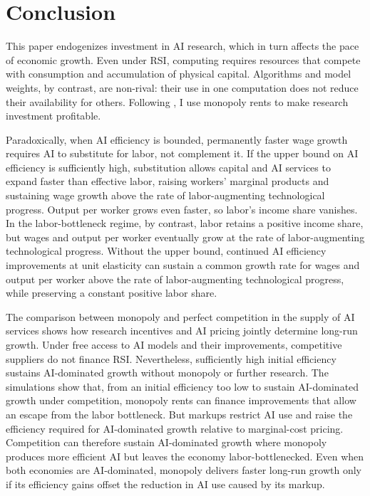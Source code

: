 \section{Conclusion}
\label{sec:rewrite-conclusion}

This paper endogenizes investment in AI research, which in turn affects the pace of economic growth. Even under RSI, computing requires resources that compete with consumption and accumulation of physical capital. Algorithms and model weights, by contrast, are non-rival: their use in one computation does not reduce their availability for others. Following \citet{romer1990}, I use monopoly rents to make research investment profitable.

Paradoxically, when AI efficiency is bounded, permanently faster wage growth requires AI to substitute for labor, not complement it. If the upper bound on AI efficiency is sufficiently high, substitution allows capital and AI services to expand faster than effective labor, raising workers’ marginal products and sustaining wage growth above the rate of labor-augmenting technological progress. Output per worker grows even faster, so labor’s income share vanishes. In the labor-bottleneck regime, by contrast, labor retains a positive income share, but wages and output per worker eventually grow at the rate of labor-augmenting technological progress. Without the upper bound, continued AI efficiency improvements at unit elasticity can sustain a common growth rate for wages and output per worker above the rate of labor-augmenting technological progress, while preserving a constant positive labor share.

The comparison between monopoly and perfect competition in the supply of AI services shows how research incentives and AI pricing jointly determine long-run growth. Under free
access to AI models and their improvements, competitive suppliers do not
finance RSI. Nevertheless, sufficiently high initial efficiency sustains
AI-dominated growth without monopoly or further research. The simulations
show that, from an initial efficiency too low to sustain AI-dominated growth
under competition, monopoly rents can finance improvements that allow
an escape from the labor bottleneck. But markups restrict AI use and
raise the efficiency required for AI-dominated growth relative to marginal-cost pricing.
Competition can therefore sustain AI-dominated growth where monopoly
produces more efficient AI but leaves the economy labor-bottlenecked.
Even when both economies are AI-dominated, monopoly delivers faster
long-run growth only if its efficiency gains offset the reduction in AI
use caused by its markup.


